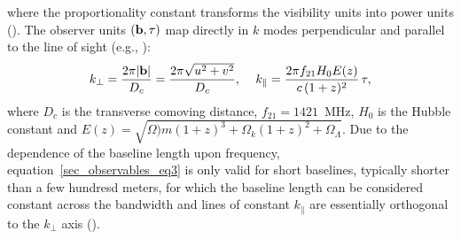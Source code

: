 where the proportionality constant transforms the visibility units into power units (\cite{parsons12b}). The observer units $({\bf b},\tau)$ map directly in $k$ modes perpendicular and parallel to the line of sight (e.g., \cite{morales04}):
\begin{equation}
k_\perp = \frac{2 \pi |{\bf b}|}{D_c} = \frac{2 \pi \sqrt{u^2 + v^2}}{D_c}, \,\,\,\,\,\,\,    k_\parallel = \frac{2 \pi f_{21} H_0 E(z)}{c \, (1 + z)^2} \, \tau,
\label{sec_observables_eq4}
\end{equation}
where $D_c$ is the transverse comoving distance, $f_{21} = 1421$~MHz, $H_0$ is the Hubble constant and $E(z) = \sqrt{\Omega)m (1+z)^3 + \Omega_k (1+z)^2 + \Omega_\Lambda}$. Due to the dependence of the baseline length upon frequency, equation~\ref{sec_observables_eq3} is only valid for short baselines, typically shorter than a few hundresd meters, for which the baseline length can be considered constant across the bandwidth and lines of constant $k_\parallel$ are essentially orthogonal to the $k_\perp$ axis (\cite{parsons12b}).

